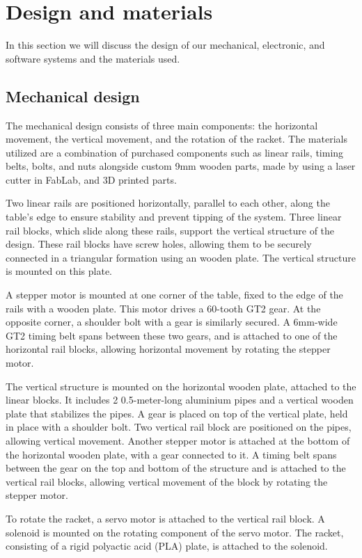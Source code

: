 \chapter{Design and materials}
In this section we will discuss the design of our mechanical, electronic, and software systems and the materials used.

\section{Mechanical design}
The mechanical design consists of three main components: the horizontal movement,  the vertical movement,  and the rotation of the racket. 
The materials utilized are a combination of purchased components such as linear rails, timing belts, bolts, and nuts alongside custom 9mm wooden parts, made by using a laser cutter in FabLab, and 3D printed parts.

Two linear rails are positioned horizontally, parallel to each other, along the table's edge to ensure stability and prevent tipping of the system. Three linear rail blocks, which slide along these rails, support the vertical structure of the design. These rail blocks have screw holes, allowing them to be securely connected in a triangular formation using an wooden plate. The vertical structure is mounted on this plate.

A stepper motor is mounted at one corner of the table, fixed to the edge of the rails with a wooden plate. This motor drives a 60-tooth GT2 gear. At the opposite corner, a shoulder bolt with a gear is similarly secured. A 6mm-wide GT2 timing belt spans between these two gears, and is attached to one of the horizontal rail blocks, allowing horizontal movement by rotating the stepper motor.

The vertical structure is mounted on the horizontal wooden plate, attached to the linear blocks. It includes 2 0.5-meter-long aluminium pipes and a vertical wooden plate that stabilizes the pipes. A gear is placed on top of the vertical plate, held in place with a shoulder bolt. Two vertical rail block are positioned on the pipes, allowing vertical movement. Another stepper motor is attached at the bottom of the horizontal wooden plate, with a gear connected to it. A timing belt spans between the gear on the top and bottom of the structure and is attached to the vertical rail blocks, allowing vertical movement of the block by rotating the stepper motor.

To rotate the racket, a servo motor is attached to the vertical rail block. A solenoid is mounted on the rotating component of the servo motor. The racket, consisting of a rigid polyactic acid (PLA) plate, is attached to the solenoid.

